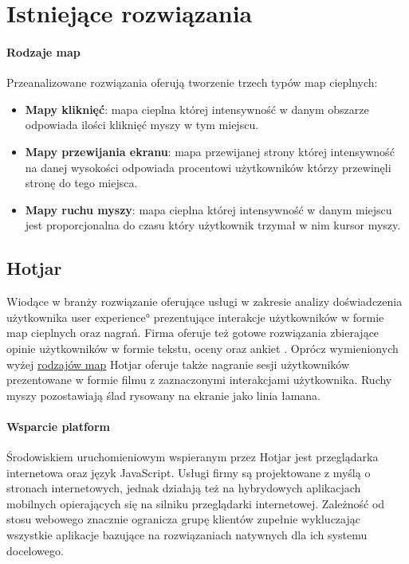 \section{Istniejące rozwiązania}

\paragraph{Rodzaje map}
\label{par:heat_map_types}
Przeanalizowane rozwiązania oferują tworzenie trzech typów map cieplnych:

\begin{itemize}
	\item {\bf Mapy kliknięć}: mapa cieplna której intensywność w danym obszarze odpowiada ilości kliknięć myszy w tym miejscu.
	\item {\bf Mapy przewijania ekranu}: mapa przewijanej strony której intensywność na danej wysokości odpowiada procentowi użytkowników którzy przewinęli stronę do tego miejsca.
	\item {\bf Mapy ruchu myszy}: mapa cieplna której intensywność w danym miejscu jest proporcjonalna do czasu który użytkownik trzymał w nim kursor myszy.
\end{itemize}

\subsection{Hotjar}
Wiodące w branży rozwiązanie oferujące usługi w zakresie analizy doświadczenia użytkownika \ang{user experience} prezentujące interakcje użytkowników w formie map cieplnych oraz nagrań. Firma oferuje też gotowe rozwiązania zbierające opinie użytkowników w formie tekstu, oceny oraz ankiet \cite{Hotjar_website}. Oprócz wymienionych wyżej \hyperref[{par:heat_map_types}]{rodzajów map} Hotjar oferuje także nagranie sesji użytkowników prezentowane w formie filmu z zaznaczonymi interakcjami użytkownika. Ruchy myszy pozostawiają ślad rysowany na ekranie jako linia łamana.

\paragraph{Wsparcie platform} 
Środowiskiem uruchomieniowym wspieranym przez Hotjar jest przeglądarka internetowa oraz język JavaScript. Usługi firmy są projektowane z myślą o stronach internetowych, jednak działają też na hybrydowych aplikacjach mobilnych opierających się na silniku przeglądarki internetowej. Zależność od stosu webowego znacznie ogranicza grupę klientów zupełnie wykluczając wszystkie aplikacje bazujące na rozwiązaniach natywnych dla ich systemu docelowego.

